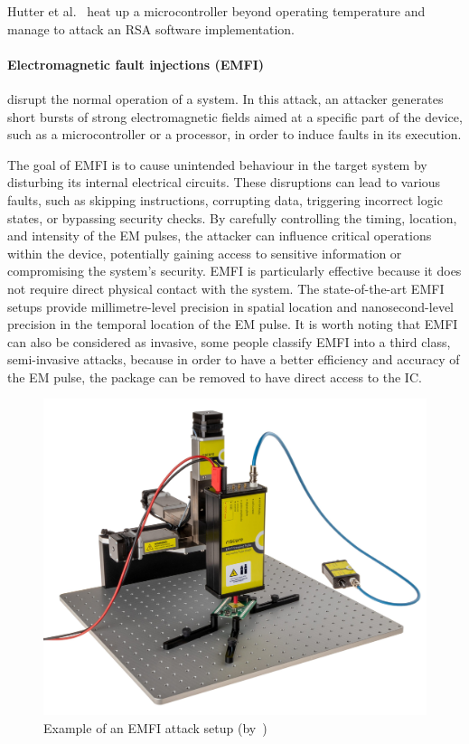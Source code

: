 Hutter et al.~\cite{HS-14-cardis} heat up a microcontroller beyond operating temperature and manage to attack an RSA software implementation.

\paragraph{Electromagnetic fault injections (EMFI)} disrupt the normal operation of a system. In this attack, an attacker generates short bursts of strong electromagnetic fields aimed at a specific part of the device, such as a microcontroller or a processor, in order to induce faults in its execution.

The goal of EMFI is to cause unintended behaviour in the target system by disturbing its internal electrical circuits. These disruptions can lead to various faults, such as skipping instructions, corrupting data, triggering incorrect logic states, or bypassing security checks. By carefully controlling the timing, location, and intensity of the EM pulses, the attacker can influence critical operations within the device, potentially gaining access to sensitive information or compromising the system's security.
EMFI is particularly effective because it does not require direct physical contact with the system. The state-of-the-art EMFI setups provide millimetre-level precision in spatial location and nanosecond-level precision in the temporal location of the EM pulse. It is worth noting that EMFI can also be considered as invasive, some people classify EMFI into a third class, semi-invasive attacks, because in order to have a better efficiency and accuracy of the EM pulse, the package can be removed to have direct access to the IC.

\begin{figure}[ht]
    \centering
    \includegraphics[width=.5\textwidth]{c2_soa/img/emfi_riscure_setup.jpg}
    \caption{Example of an EMFI attack setup (by~\cite{riscure_emfi})}
    \label{fig:emfi_setup}
\end{figure}

